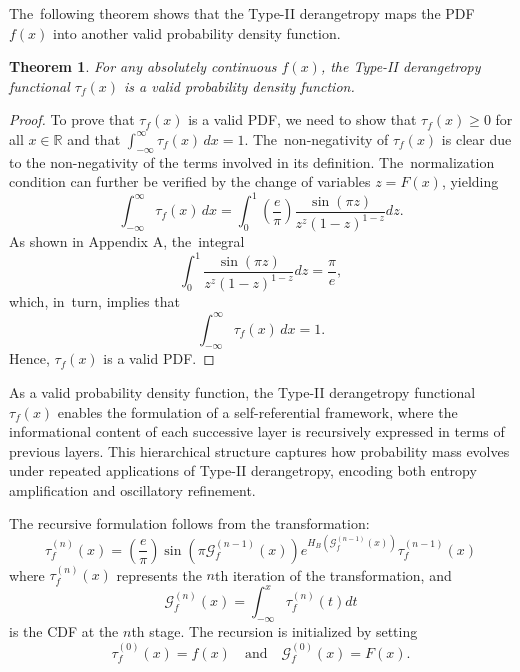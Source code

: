 \documentclass[sn-mathphys-num]{sn-jnl}%
\theoremstyle{thmstyleone}%
\newtheorem{theorem}{Theorem}%
\theoremstyle{thmstyletwo}%
\theoremstyle{thmstylethree}%
\begin{document}
The~following theorem shows that the Type-II derangetropy maps the PDF $f(x)$ into another valid probability density function.
\begin{theorem}
	For any absolutely continuous $f(x)$, the Type-II derangetropy functional $\tau_f(x)$ is a valid probability density function.
\end{theorem}
\begin{proof}
	To prove that $\tau_f(x)$ is a valid PDF, we need to show that $\tau_f(x) \geq 0$ for all $x \in \mathbb{R}$ and that $\int_{-\infty}^{\infty} \tau_f(x) \, dx = 1$. The~non-negativity of $\tau_f(x)$ is clear due to the non-negativity of the terms involved in its definition. The~normalization condition can further be verified by the change of variables $z = F(x)$, yielding
	\begin{equation}
		\int_{-\infty}^{\infty} \tau_f(x) \, dx = \int_{0}^{1} \left(\frac{e}{\pi}\right) \dfrac{\sin (\pi z)}{z^z(1-z)^{1-z}}  dz.
	\end{equation}	
	{As shown} 
	in Appendix A, the~integral
	\begin{equation}
		\int_{0}^{1} \dfrac{\sin (\pi z)}{z^z(1-z)^{1-z}} dz = \frac{\pi}{e},
	\end{equation}	
	which, in~turn, implies that
	\begin{equation}
		\int_{-\infty}^{\infty} \tau_f(x) \, dx = 1.
	\end{equation}
	Hence, $\tau_f(x)$ is a valid PDF.
\end{proof}


As a valid probability density function, the Type-II derangetropy functional $\tau_f(x)$ enables the formulation of a self-referential framework, where the informational content of each successive layer is recursively expressed in terms of previous layers. This hierarchical structure captures how probability mass evolves under repeated applications of Type-II derangetropy, encoding both entropy amplification and oscillatory refinement.

The recursive formulation follows from the transformation:
$$
\tau_f^{(n)}(x)=\left(\frac{e}{\pi}\right) \sin \left(\pi \mathcal{G}_f^{(n-1)}(x)\right) e^{H_B\left(\mathcal{G}_f^{(n-1)}(x)\right)} \tau_f^{(n-1)}(x)
$$
where $\tau_f^{(n)}(x)$ represents the $n$th iteration of the transformation, and
$$
\mathcal{G}_f^{(n)}(x)=\int_{-\infty}^x \tau_f^{(n)}(t) d t
$$
is the CDF at the $n$th stage. The recursion is initialized by setting
$$
\tau_f^{(0)}(x)=f(x) \quad \text{and} \quad \mathcal{G}_f^{(0)}(x)=F(x).
$$
\end{document}
